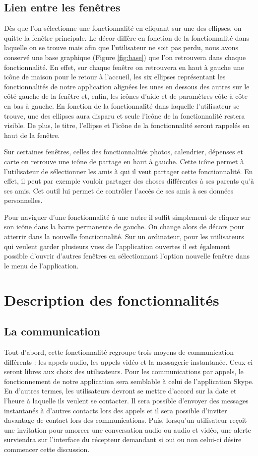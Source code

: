 \documentclass[11pt]{article}
\begin{document}
\subsection{Lien entre les fenêtres}
Dès que l'on sélectionne une fonctionnalité en cliquant sur une des ellipses, on quitte la fenêtre principale. Le décor diffère en fonction de la fonctionnalité dans laquelle on se trouve mais afin que l'utilisateur ne soit pas perdu, nous avons conservé une base graphique (Figure \ref{fig:base}) que l'on retrouvera dans chaque fonctionnalité. En effet, sur chaque fenêtre on retrouvera en haut à gauche une icône de maison pour le retour à l'accueil, les six ellipses représentant les fonctionnalités de notre application alignées les unes en dessous des autres sur le côté gauche de la fenêtre et, enfin, les icônes d'aide et de paramètres côte à côte en bas à gauche.
En fonction de la fonctionnalité dans laquelle l'utilisateur se trouve, une des ellipses aura disparu et seule l'icône de la fonctionnalité restera visible. De plus, le titre, l'ellipse et l'icône de la fonctionnalité seront rappelés en haut de la fenêtre.

Sur certaines fenêtres, celles des fonctionnalités photos, calendrier, dépenses et carte on retrouve une icône de partage en haut à gauche. Cette icône permet à l'utilisateur de sélectionner les amis à qui il veut partager cette fonctionnalité. En effet, il peut par exemple vouloir partager des choses différentes à ses parents qu'à ses amis. Cet outil lui permet de contrôler l'accès de ses amis à ses données personnelles. 

Pour naviguer d'une fonctionnalité à une autre il suffit simplement de cliquer sur son icône dans la barre permanente de gauche. On change alors de décors pour atterrir dans la nouvelle fonctionnalité. Sur un ordinateur, pour les utilisateurs qui veulent garder plusieurs vues de l'application ouvertes il est également possible d'ouvrir d'autres fenêtres en sélectionnant l'option nouvelle fenêtre dans le menu de l'application.

\section{Description des fonctionnalités}
\subsection{La communication}\label{par:com}
	Tout d’abord, cette fonctionnalité regroupe trois moyens de communication différents : les appels audio, les appels vidéo et la messagerie instantanée. Ceux-ci seront libres aux choix des utilisateurs. Pour les communications par appels, le fonctionnement de notre application sera semblable à celui de l’application Skype. En d’autres termes, les utilisateurs devront se mettre d’accord sur la date et l’heure à laquelle ils veulent se contacter. Il sera possible d’envoyer des messages instantanés à d’autres contacts lors des appels  et il sera possible d'inviter davantage de contact lors des communications. Puis, lorsqu’un utilisateur reçoit une invitation pour amorcer une conversation audio ou audio et vidéo, une alerte surviendra sur l’interface du récepteur demandant si oui ou non celui-ci désire commencer cette discussion. 
	
\end{document}
